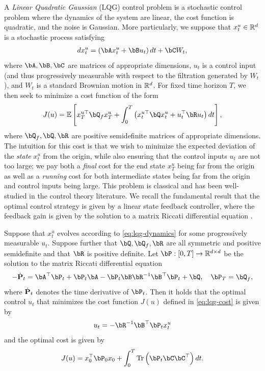 A \emph{Linear Quadratic Gaussian} (LQG) control problem is a stochastic control problem where the dynamics of the system are linear, the cost function is quadratic, and the noise is Gaussian.  More particularly, we suppose that $x_t^u \in \mathbb{R}^d$ is a stochastic process satisfying
\begin{align}\label{eq:lqg-dynamics}
    d x_t^u = \left( \bA x_t^u + \bB u_t \right) d t + \bC W_t,
\end{align}
where $\bA, \bB, \bC$ are matrices of appropriate dimensions, $u_t$ is a control input (and thus progressively measurable with respect to the filtration generated by $W_t$), and $W_t$ is a standard Brownian motion in $\mathbb{R}^d$.  For fixed time horizon $T$, we then seek to minimize a cost function of the form
\begin{align}\label{eq:lqg-cost}
    J(u) = \ee\left[ x_T^{u \top} \bQ_f x_T^u + \int_0^T \left( x_t^{u \top} \bQ x_t^u + u_t^\top \bR u_t \right) d t \right],
\end{align}
where $\bQ_f, \bQ, \bR$ are positive semidefinite matrices of appropriate dimensions.  The intuition for this cost is that we wish to minimize the expected deviation of the \emph{state} $x_t^u$ from the origin, while also ensuring that the control inputs $u_t$ are not too large; we pay both a \emph{final} cost for the end state $x_T^u$ being far from the origin as well as a \emph{running} cost for both intermediate states being far from the origin and control inputs being large.  This problem is classical and has been well-studied in the control theory literature.  We recall the fundamental result that the optimal control strategy is given by a linear state feedback controller, where the feedback gain is given by the solution to a matrix Riccati differential equation \citep{georgiou2013separation,kwakernaak1972linear}.
\begin{theorem}\label{thm:lqg}
    Suppose that $x_t^u$ evolves according to \eqref{eq:lqg-dynamics} for some progressively measurable $u_t$.  Suppose further that $\bQ, \bQ_f, \bR$ are all symmetric and positive semidefinite and that $\bR$ is positive definite.  Let $\bP: [0, T] \to \rr^{d \times d}$ be the solution to the matrix Riccati differential equation
    \begin{align}\label{eq:riccati_general}
        - \bPdot_t = \bA^\top \bP_t + \bP_t \bA - \bP_t \bB \bR^{-1} \bB^\top \bP_t + \bQ, \quad \bP_T = \bQ_f,
    \end{align}
    where $\dot{\mathbf{P}}_t$ denotes the time derivative of $\bP_t$.  Then it holds that the optimal control $u_t$ that minimizes the cost function $J(u)$ defined in \eqref{eq:lqg-cost} is given by
    \begin{align}\label{eq:lqg-optimal-control}
        u_t = - \bR^{-1} \bB^\top \bP_t x_t^u
    \end{align}
    and the optimal cost is given by
    \begin{align}\label{eq:lqg-optimal-cost}
        J(u) = x_0^\top \bP_0 x_0 + \int_0^T \trace\left( \bP_t \bC \bC^\top \right) d t.
    \end{align}
\end{theorem}
